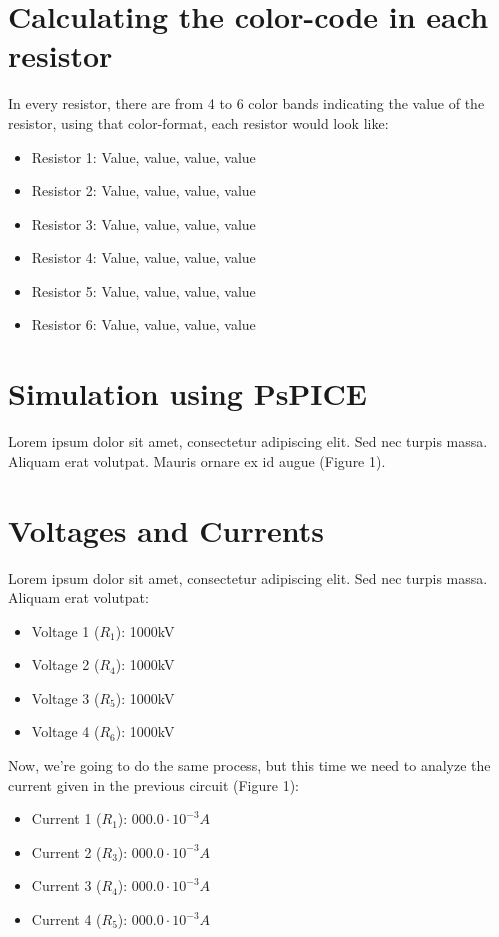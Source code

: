 \documentclass[article]{IEEEtran}
\begin{document}
\section*{Calculating the color-code in each resistor}
In every resistor, there are from 4 to 6 color bands indicating the value of the resistor, using that color-format, each resistor would look like:
\begin{itemize}
    \item Resistor 1:
Value, value, value, value
    \item Resistor 2:
Value, value, value, value
    \item Resistor 3:
Value, value, value, value
    \item Resistor 4:
Value, value, value, value
    \item Resistor 5:
Value, value, value, value
    \item Resistor 6:
Value, value, value, value
\end{itemize}

\section*{Simulation using PsPICE}
Lorem ipsum dolor sit amet, consectetur adipiscing elit. Sed nec turpis massa. Aliquam erat volutpat. Mauris ornare ex id augue (Figure 1).

\section*{Voltages and Currents}
Lorem ipsum dolor sit amet, consectetur adipiscing elit. Sed nec turpis massa. Aliquam erat volutpat:
\begin{itemize}
    \item Voltage 1 ($R_1$): 1000kV 
    \item Voltage 2 ($R_4$): 1000kV
    \item Voltage 3 ($R_5$): 1000kV
    \item Voltage 4 ($R_6$): 1000kV
\end{itemize}

Now, we're going to do the same process, but this time we need to analyze the current given in the previous circuit (Figure 1):
\begin{itemize}
    \item Current 1 ($R_1$): $000.0 \cdot 10^{-3} A$ 
    \item Current 2 ($R_3$): $000.0 \cdot 10^{-3} A$
    \item Current 3 ($R_4$): $000.0 \cdot 10^{-3} A$
    \item Current 4 ($R_5$): $000.0 \cdot 10^{-3} A$
\end{itemize}
\end{document}

